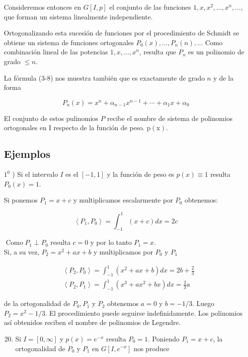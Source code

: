 \documentclass[10pt]{article}
\theoremstyle{plain}
\theoremstyle{definition}
\theoremstyle{remark}
\begin{document}
Consideremos entonces en $G[I, p]$ el conjunto de las funciones $1, x, x^{2}, \ldots, x^{n}, \ldots$, que forman un sistema linealmente independiente.

Ortogonalizando esta sucesión de funciones por el procedimiento de Schmidt se obtiene un sistema de funciones ortogonales $P_{0}(x), \ldots, P_{n}(n), \ldots$ Como combinación lineal de las potencias $1, x, \ldots, x^{n}$, resulta que $P_{n}$ es un polinomio de grado $\leqslant n$.

La fórmula (3-8) nos muestra también que es exactamente de grado $n$ y de la forma

$$
P_{n}(x)=x^{n}+\alpha_{n-1} x^{n-1}+\cdots+\alpha_{1} x+\alpha_{0}
$$

El conjunto de estos pulinomios $P$ recibe el nombre de sistema de polinomios ortogonales en I respecto de la función de peso. $\mathrm{p}(\mathrm{x})$.

\subsection*{Ejemplos}
$1^{0}$ ) Si el intervalo $I$ es el $[-1,1]$ y la función de peso es $p(x) \equiv 1$ resulta $P_{0}(x)=1$.

Si ponemos $P_{1}=x+c$ y multiplicamos escalarmente por $P_{0}$ obtenemos:

$$
\left\langle P_{1}, P_{0}\right\rangle=\int_{-1}^{1}(x+c) d x=2 c
$$

$\operatorname{Como} P_{1} \perp P_{0}$ resulta $c=0$ y por lo tanto $P_{1}=x$.\\
Si, a su vez, $P_{2}=x^{2}+a x+b$ y multiplicamos por $P_{0}$ y $P_{1}$

$$
\begin{aligned}
& \left\langle P_{2}, P_{0}\right\rangle=\int_{-1}^{1}\left(x^{2}+a x+b\right) d x=2 b+\frac{2}{3} \\
& \left\langle P_{2}, P_{1}\right\rangle=\int_{-1}^{1}\left(x^{3}+a x^{2}+b x\right) d x=\frac{2}{3} a
\end{aligned}
$$

de la ortogonalidad de $P_{0}, P_{1}$ y $P_{2}$ obtenemos $a=0$ y $b=-1 / 3$. Luego $P_{2}=x^{2}-1 / 3$. El procedimiento puede seguirse indefinidamente. Los polinomios así obtenidos reciben el nombre de polinomios de Legendre.


\begin{enumerate}
  \setcounter{enumi}{19}
  \item Si $I=[0, \infty]$ y $p(x)=e^{-x}$ resulta $P_{0}=1$. Poniendo $P_{1}=x+c$, la ortogonalidad de $P_{0}$ y $P_{1}$ en $G\left[I, e^{-x}\right]$ nos produce
\end{enumerate}
\end{document}
